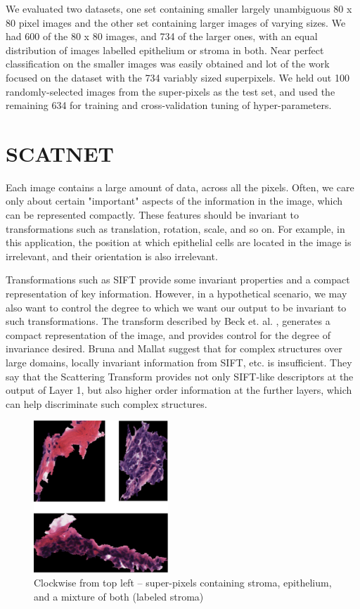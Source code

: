 \documentclass{article}
\begin{document}
We evaluated two datasets, one set containing smaller largely unambiguous 80 x 80
pixel images and the other set containing larger images of varying sizes. We had 600
of the 80 x 80 images, and 734 of the larger ones, with an equal distribution of
images labelled epithelium or stroma in both. Near perfect classification on the
smaller images was easily obtained and lot of the work focused on the dataset with
the 734 variably sized superpixels. We held out 100 randomly-selected images from
the super-pixels as the test set, and used the remaining 634 for training and
cross-validation tuning of hyper-parameters.

\section{SCATNET}
\label{sec:scatnet}

Each image contains a large amount of data, across all the pixels. Often, we care
only about certain "important" aspects of the information in the image, which can
be represented compactly. These features should be invariant to transformations such
as translation, rotation, scale, and so on. For example, in this application, the
position at which epithelial cells are located in the image is irrelevant, and their
orientation is also irrelevant.

Transformations such as SIFT \cite{Lowe1999} provide some invariant properties and a
compact representation of key information. However, in a hypothetical scenario, we may
also want to control the degree to which we want our output to be invariant to such
transformations. The transform described by Beck et. al. \cite{Beck2011}, generates a
compact representation of the image, and provides control for the degree of invariance
desired. Bruna and Mallat \cite{Bruna2013} suggest that for complex structures over
large domains, locally invariant information from SIFT, etc. is insufficient. They
say that the Scattering Transform provides not only SIFT-like descriptors at the
output of Layer 1, but also higher order information at the further layers, which
can help discriminate such complex structures. 

\begin{figure}
	\centering
	\includegraphics[width=0.45\textwidth]{images-mashup}
	\caption{Clockwise from top left -- super-pixels containing stroma, epithelium,
		and a mixture of both	(labeled stroma)}
\end{figure}
\end{document}
